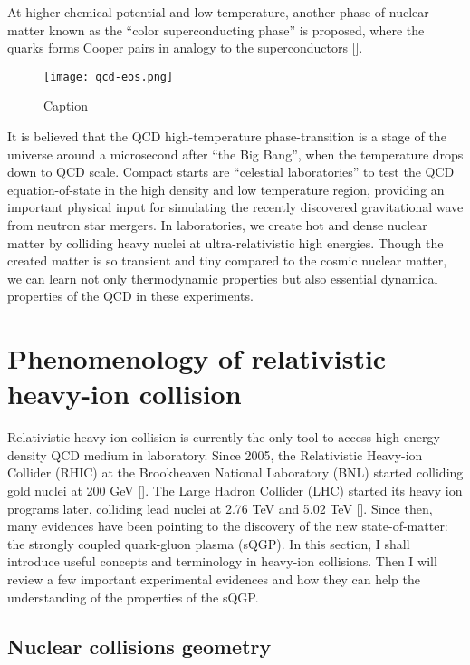 At higher chemical potential and low temperature, another phase of nuclear matter known as the ``color superconducting phase'' is proposed, where the quarks forms Cooper pairs in analogy to the superconductors [].

\begin{figure}
    \centering
    \texttt{[image: qcd-eos.png]}
    \caption{Caption}
    \label{fig:qcd_eos}
\end{figure}

It is believed that the QCD high-temperature phase-transition is a stage of the universe around a microsecond after ``the Big Bang'', when the temperature drops down to QCD scale.
Compact starts are ``celestial laboratories'' to test the QCD equation-of-state in the high density and low temperature region, providing an important physical input for simulating the recently discovered gravitational wave from neutron star mergers.
In laboratories, we create hot and dense nuclear matter by colliding heavy nuclei at ultra-relativistic high energies.
Though the created matter is so transient and tiny compared to the cosmic nuclear matter, we can learn not only thermodynamic properties but also essential dynamical properties of the QCD in these experiments.

\section{Phenomenology of relativistic heavy-ion collision}
Relativistic heavy-ion collision is currently the only tool to access high energy density QCD medium in laboratory.
Since 2005, the Relativistic Heavy-ion Collider (RHIC) at the Brookheaven National Laboratory (BNL) started colliding gold nuclei at 200 GeV []. 
The Large Hadron Collider (LHC) started its heavy ion programs later, colliding lead nuclei at 2.76 TeV and 5.02 TeV [].
Since then, many evidences have been pointing to the discovery of the new state-of-matter: the strongly coupled quark-gluon plasma (sQGP).
In this section, I shall introduce useful concepts and terminology in heavy-ion collisions.
Then I will review a few important experimental evidences and how they can help the understanding of the properties of the sQGP.

\subsection{Nuclear collisions geometry}
